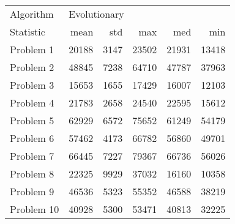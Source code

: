 \begin{tabular}{lrrrrr}
\toprule
Algorithm & \multicolumn{5}{l}{Evolutionary} \\
Statistic &         mean &   std &    max &    med &    min \\
\midrule
Problem 1  &        20188 &  3147 &  23502 &  21931 &  13418 \\
Problem 2  &        48845 &  7238 &  64710 &  47787 &  37963 \\
Problem 3  &        15653 &  1655 &  17429 &  16007 &  12103 \\
Problem 4  &        21783 &  2658 &  24540 &  22595 &  15612 \\
Problem 5  &        62929 &  6572 &  75652 &  61249 &  54179 \\
Problem 6  &        57462 &  4173 &  66782 &  56860 &  49701 \\
Problem 7  &        66445 &  7227 &  79367 &  66736 &  56026 \\
Problem 8  &        22325 &  9929 &  37032 &  16160 &  10358 \\
Problem 9  &        46536 &  5323 &  55352 &  46588 &  38219 \\
Problem 10 &        40928 &  5300 &  53471 &  40813 &  32225 \\
\bottomrule
\end{tabular}
